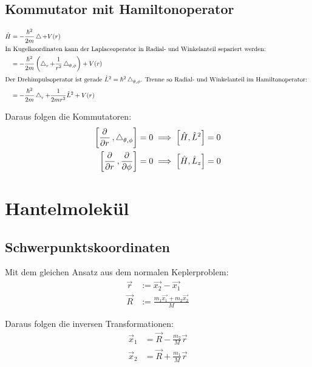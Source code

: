 \subsection{Kommutator mit Hamiltonoperator}

\begin{align*}
	\hat H
	&= - \frac{\hbar^2}{2m} \laplace + V(r) \\
	\intertext{%
		In Kugelkoordinaten kann der Laplaceoperator in Radial- und
		Winkelanteil separiert werden:
	}
	&= - \frac{\hbar^2}{2m} \del{\laplace_r + \frac{1}{r^2} \laplace_{\theta,\phi}} + V(r) \\
	\intertext{%
		Der Drehimpulsoperator ist gerade $\hat L^2 = \hbar^2
		\laplace_{\theta,\phi}$. Trenne so Radial- und Winkelanteil im
		Hamiltonoperator:
	}
	&= - \frac{\hbar^2}{2m} \laplace_r + \frac{1}{2mr^2} \hat L^2 + V(r)
\end{align*}

Daraus folgen die Kommutatoren:
\begin{align*}
	\sbr{\dpd{}r, \laplace_{\theta,\phi}} = 0
	&\implies
	\sbr{\hat H, \hat L^2} = 0 \\
	\sbr{\dpd{}r, \dpd{}\phi} = 0
	&\implies
	\sbr{\hat H, \hat L_z} = 0
\end{align*}


\section{Hantelmolekül}

\subsection{Schwerpunktskoordinaten}

Mit dem gleichen Ansatz aus dem normalen Keplerproblem:
\begin{align*}
	\vec r &:= \vec{x_2} - \vec{x_1} \\
	\vec R &:= \frac{m_1 \vec{x_1} + m_2 \vec{x_2}}M
\end{align*}

Daraus folgen die inversen Transformationen:
\begin{align*}
	\vec x_1 &= \vec R - \frac{m_2}M \vec r \\
	\vec x_2 &= \vec R + \frac{m_1}M \vec r
\end{align*}

